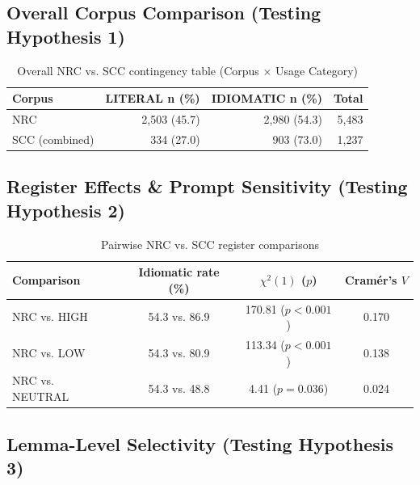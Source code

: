\documentclass[11pt,a4paper]{article}
\begin{document}
\subsection{Overall Corpus Comparison (Testing Hypothesis 1)}\label{subsec:hypothesis1-test}

\blindtext

\begin{table}[htbp]
\centering
\caption[Overall NRC--SCC Contingency]{Overall NRC vs. SCC contingency table (Corpus $\times$ Usage Category)}
\label{tab:results-overall-contingency}
\begin{tabular}{lrrr}
\toprule
\textbf{Corpus} & \textbf{LITERAL n (\%)} & \textbf{IDIOMATIC n (\%)} & \textbf{Total} \\
\midrule
NRC & 2{,}503 (45.7) & 2{,}980 (54.3) & 5{,}483 \\
SCC (combined) & 334 (27.0) & 903 (73.0) & 1{,}237 \\
\bottomrule
\end{tabular}
\end{table}

\blindtext

\subsection{Register Effects \& Prompt Sensitivity (Testing Hypothesis 2)}\label{subsec:hypothesis2-test}

\blindtext

\begin{table}[htbp]
\centering
\caption[Pairwise Register Comparisons]{Pairwise NRC vs. SCC register comparisons}
\label{tab:results-register-pairwise}
\begin{tabular}{lccc}
\toprule
\textbf{Comparison} & \textbf{Idiomatic rate (\%)} & \textbf{$\chi^2(1)$ ($p$)} & \textbf{Cramér's $V$} \\
\midrule
NRC vs. HIGH & 54.3 vs. 86.9 & 170.81 ($p < 0.001$) & 0.170 \\
NRC vs. LOW & 54.3 vs. 80.9 & 113.34 ($p < 0.001$) & 0.138 \\
NRC vs. NEUTRAL & 54.3 vs. 48.8 & 4.41 ($p = 0.036$) & 0.024 \\
\bottomrule
\end{tabular}
\end{table}

\blindtext

\subsection{Lemma-Level Selectivity (Testing Hypothesis 3)}\label{subsec:hypothesis3-test}
\end{document}
